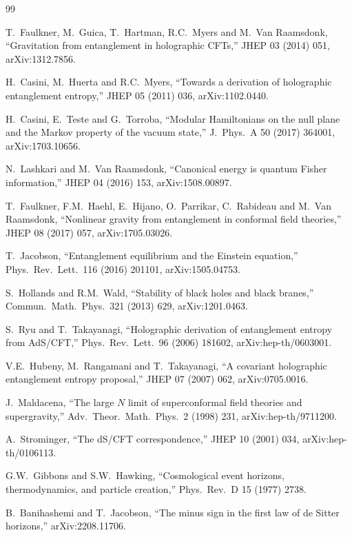 \documentclass[11pt]{article}
\theoremstyle{definition}
\begin{document}
\begin{thebibliography}{99}

T.~Faulkner, M.~Guica, T.~Hartman, R.C.~Myers and M.~Van Raamsdonk,
``Gravitation from entanglement in holographic CFTs,''
JHEP 03 (2014) 051, arXiv:1312.7856.

H.~Casini, M.~Huerta and R.C.~Myers,
``Towards a derivation of holographic entanglement entropy,''
JHEP 05 (2011) 036, arXiv:1102.0440.

H.~Casini, E.~Teste and G.~Torroba,
``Modular Hamiltonians on the null plane and the Markov property of the vacuum state,''
J.\ Phys.\ A 50 (2017) 364001, arXiv:1703.10656.

N.~Lashkari and M.~Van Raamsdonk,
``Canonical energy is quantum Fisher information,''
JHEP 04 (2016) 153, arXiv:1508.00897.

T.~Faulkner, F.M.~Haehl, E.~Hijano, O.~Parrikar, C.~Rabideau and M.~Van Raamsdonk,
``Nonlinear gravity from entanglement in conformal field theories,''
JHEP 08 (2017) 057, arXiv:1705.03026.

T.~Jacobson,
``Entanglement equilibrium and the Einstein equation,''
Phys.\ Rev.\ Lett.\ 116 (2016) 201101, arXiv:1505.04753.

S.~Hollands and R.M.~Wald,
``Stability of black holes and black branes,''
Commun.\ Math.\ Phys.\ 321 (2013) 629, arXiv:1201.0463.

S.~Ryu and T.~Takayanagi,
``Holographic derivation of entanglement entropy from AdS/CFT,''
Phys.\ Rev.\ Lett.\ 96 (2006) 181602, arXiv:hep-th/0603001.

V.E.~Hubeny, M.~Rangamani and T.~Takayanagi,
``A covariant holographic entanglement entropy proposal,''
JHEP 07 (2007) 062, arXiv:0705.0016.

J.~Maldacena,
``The large $N$ limit of superconformal field theories and supergravity,''
Adv.\ Theor.\ Math.\ Phys.\ 2 (1998) 231, arXiv:hep-th/9711200.

A.~Strominger,
``The dS/CFT correspondence,''
JHEP 10 (2001) 034, arXiv:hep-th/0106113.

G.W.~Gibbons and S.W.~Hawking,
``Cosmological event horizons, thermodynamics, and particle creation,''
Phys.\ Rev.\ D 15 (1977) 2738.

B.~Banihashemi and T.~Jacobson,
``The minus sign in the first law of de Sitter horizons,''
arXiv:2208.11706.


\end{thebibliography}
\end{document}
